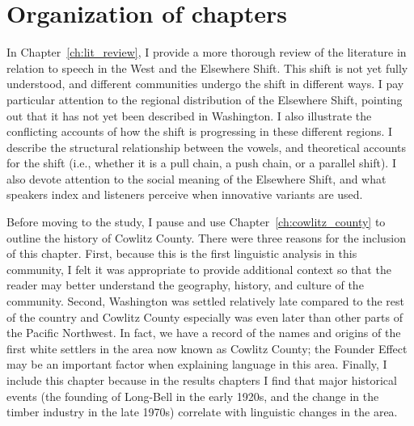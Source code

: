 \section{Organization of chapters}

In Chapter~\ref{ch:lit_review}, I provide a more thorough review of the literature in relation to speech in the West and the Elsewhere Shift. This shift is not yet fully understood, and different communities undergo the shift in different ways. I pay particular attention to the regional distribution of the Elsewhere Shift, pointing out that it has not yet been described in Washington. I also illustrate the conflicting accounts of how the shift is progressing in these different regions. I describe the structural relationship between the vowels, and theoretical accounts for the shift (i.e., whether it is a pull chain, a push chain, or a parallel shift). I also devote attention to the social meaning of the Elsewhere Shift, and what speakers index and listeners perceive when innovative variants are used.

Before moving to the study, I pause and use Chapter~\ref{ch:cowlitz_county} to outline the history of Cowlitz County. There were three reasons for the inclusion of this chapter. First, because this is the first linguistic analysis in this community, I felt it was appropriate to provide additional context so that the reader may better understand the geography, history, and culture of the community. Second, Washington was settled relatively late compared to the rest of the country and Cowlitz County especially was even later than other parts of the Pacific Northwest. In fact, we have a record of the names and origins of the first white settlers in the area now known as Cowlitz County; the Founder Effect \citep{mufwene_1996} may be an important factor when explaining language in this area. Finally, I include this chapter because in the results chapters I find that major historical events (the founding of Long-Bell in the early 1920s, and the change in the timber industry in the late 1970s) correlate with linguistic changes in the area.

